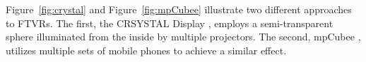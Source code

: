 Figure~\ref{fig:crystal} and Figure~\ref{fig:mpCubee} illustrate two different approaches to FTVRs. The first, the CRSYSTAL Display \cite{noauthor_crystal_nodate}, employs a semi-transparent sphere illuminated from the inside by multiple projectors. The second, mpCubee \cite{7892378}, utilizes multiple sets of mobile phones to achieve a similar effect.

\begin{invisBox}
    \hfill
\end{invisBox}

